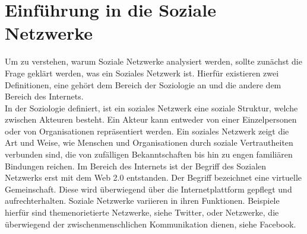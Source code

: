 \chapter{Einführung in die Soziale Netzwerke}\label{ch:SNA}
Um zu verstehen, warum Soziale Netzwerke analysiert werden, sollte zunächst die Frage geklärt werden, was ein Soziales Netzwerk ist. Hierfür existieren zwei Definitionen, eine gehört dem Bereich der Soziologie an und die andere dem Bereich des Internets. \\
In der Soziologie definiert, ist ein soziales Netzwerk eine soziale Struktur, welche zwischen Akteuren besteht. Ein Akteur kann entweder von einer Einzelpersonen oder  von Organisationen repräsentiert werden. Ein soziales Netzwerk zeigt die Art und Weise, wie Menschen und Organisationen durch soziale Vertrautheiten verbunden sind, die von zufälligen Bekanntschaften bis hin zu engen familiären Bindungen reichen. Im Bereich des Internets ist der Begriff des Sozialen Netzwerks erst mit dem Web 2.0 entstanden. Der Begriff bezeichnet eine virtuelle Gemeinschaft. Diese wird überwiegend über die Internetplattform gepflegt und aufrechterhalten. Soziale Netzwerke variieren in ihren Funktionen. Beispiele hierfür sind themenorietierte Netzwerke, siehe Twitter, oder Netzwerke, die überwiegend der zwischenmenschlichen Kommunikation dienen, siehe Facebook.

